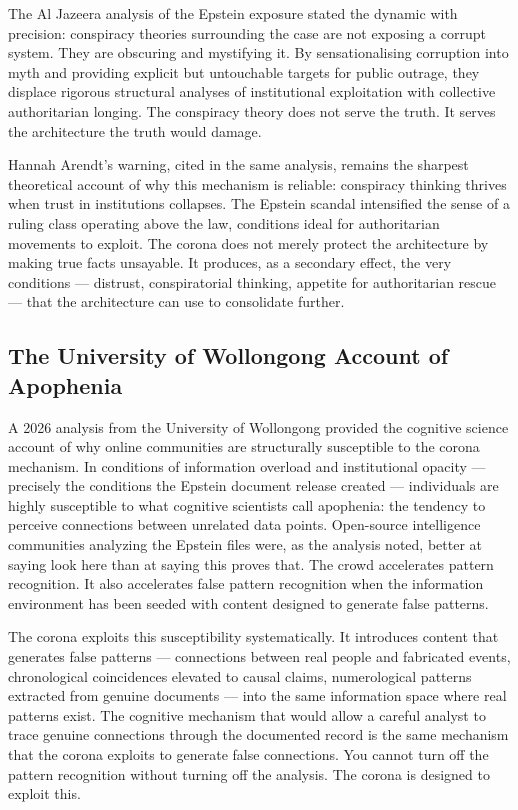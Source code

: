 \documentclass[11pt,a4paper]{article}
\begin{document}
The Al Jazeera analysis of the Epstein exposure stated the dynamic with precision: conspiracy theories surrounding the case are not exposing a corrupt system. They are obscuring and mystifying it. By sensationalising corruption into myth and providing explicit but untouchable targets for public outrage, they displace rigorous structural analyses of institutional exploitation with collective authoritarian longing. The conspiracy theory does not serve the truth. It serves the architecture the truth would damage.


Hannah Arendt's warning, cited in the same analysis, remains the sharpest theoretical account of why this mechanism is reliable: conspiracy thinking thrives when trust in institutions collapses. The Epstein scandal intensified the sense of a ruling class operating above the law, conditions ideal for authoritarian movements to exploit. The corona does not merely protect the architecture by making true facts unsayable. It produces, as a secondary effect, the very conditions — distrust, conspiratorial thinking, appetite for authoritarian rescue — that the architecture can use to consolidate further.


\subsection{The University of Wollongong Account of Apophenia}

A 2026 analysis from the University of Wollongong provided the cognitive science account of why online communities are structurally susceptible to the corona mechanism. In conditions of information overload and institutional opacity — precisely the conditions the Epstein document release created — individuals are highly susceptible to what cognitive scientists call apophenia: the tendency to perceive connections between unrelated data points. Open-source intelligence communities analyzing the Epstein files were, as the analysis noted, better at saying look here than at saying this proves that. The crowd accelerates pattern recognition. It also accelerates false pattern recognition when the information environment has been seeded with content designed to generate false patterns.


The corona exploits this susceptibility systematically. It introduces content that generates false patterns — connections between real people and fabricated events, chronological coincidences elevated to causal claims, numerological patterns extracted from genuine documents — into the same information space where real patterns exist. The cognitive mechanism that would allow a careful analyst to trace genuine connections through the documented record is the same mechanism that the corona exploits to generate false connections. You cannot turn off the pattern recognition without turning off the analysis. The corona is designed to exploit this.
\end{document}

